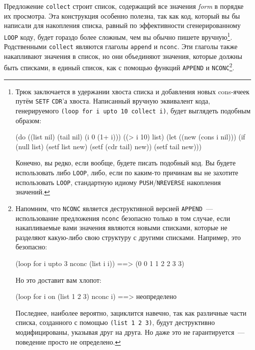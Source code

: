Предложение \lstinline{collect} строит список, содержащий все значения \textit{form} в порядке
их просмотра. Эта конструкция особенно полезна, так как код, который вы бы написали для
накопления списка, равный по эффективности сгенерированному \lstinline{LOOP} коду, будет
гораздо более сложным, чем вы обычно пишете вручную\footnote{Трюк заключается в удержании
  хвоста списка и добавления новых cons-ячеек путём \lstinline{SETF} \lstinline{CDR}'а
  хвоста. Написанный вручную эквивалент кода, генерируемого \lstinline{(loop for i upto 10 collect i)},
  будет выглядеть подобным образом:

\begin{myverb}
(do ((list nil) (tail nil) (i 0 (1+ i)))
    ((> i 10) list)
  (let ((new (cons i nil)))
    (if (null list)
        (setf list new)
        (setf (cdr tail) new))
    (setf tail new)))
\end{myverb}

Конечно, вы редко, если вообще, будете писать подобный код. Вы будете использовать либо
\lstinline{LOOP}, либо, если по каким-то причинам вы не захотите использовать \lstinline{LOOP},
стандартную идиому \lstinline{PUSH}/\lstinline{NREVERSE} накопления значений.}. Родственными
\lstinline{collect} являются глаголы \lstinline{append} и \lstinline{nconc}.  Эти глаголы также
накапливают значения в список, но они объединяют значения, которые должны быть списками, в
единый список, как с помощью функций \lstinline{APPEND} и \lstinline{NCONC}\footnote{Напомним,
  что \lstinline{NCONC} является деструктивной версией \lstinline{APPEND}~--- использование
  предложения \lstinline{nconc} безопасно только в том случае, если накапливаемые вами значения
  являются новыми списками, которые не разделяют какую-либо свою структуру с другими
  списками. Например, это безопасно:

\begin{myverb}
(loop for i upto 3 nconc (list i i)) ==> (0 0 1 1 2 2 3 3)
\end{myverb}

Но это доставит вам хлопот:

\begin{myverb}
(loop for i on (list 1 2 3) nconc i) ==> неопределено
\end{myverb}

Последнее, наиболее вероятно, зациклится навечно, так как различные части списка, созданного
с помощью \lstinline{(list 1 2 3)}, будут деструктивно модифицированы, указывая друг на
друга. Но даже это не гарантируется~--- поведение просто не определено.}.


